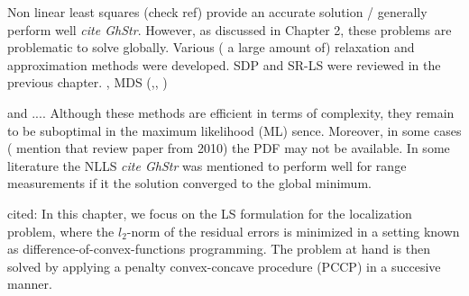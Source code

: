 Non linear least squares  (check ref) provide an accurate solution / generally perform well \textit{cite GhStr}. However, as discussed in Chapter 2, these problems are problematic to solve globally. Various ( a large amount of) relaxation and approximation methods were developed. SDP and  SR-LS were reviewed in the previous chapter.
, MDS (\cite{classMDS},\cite{fastMDS}, \cite{dwMDS}) 


and ....
Although these methods are efficient in terms of complexity, they remain to be suboptimal in the maximum likelihood (ML) sence. Moreover, in some cases ( mention that review paper from 2010) the PDF may not be available. In some literature the NLLS \textit{cite GhStr} was mentioned to perform well for range measurements if it the solution converged to the global minimum.


cited:
In this chapter, we focus on the LS formulation for the localization problem, where the $l_2$-norm of the residual errors is minimized in a setting known as difference-of-convex-functions programming. The problem at hand is then solved by applying a penalty convex-concave procedure (PCCP) in a succesive manner.


